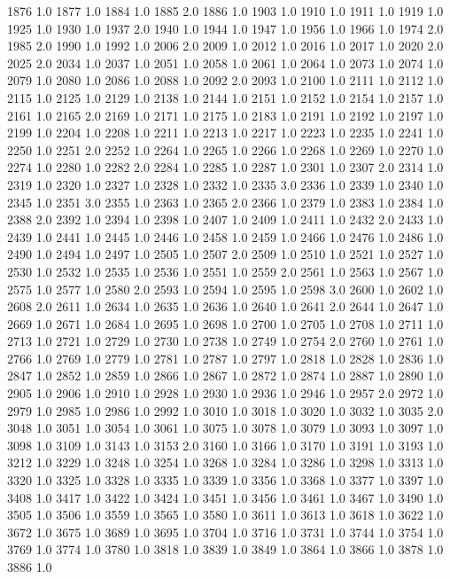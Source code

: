 1876	1.0
1877	1.0
1884	1.0
1885	2.0
1886	1.0
1903	1.0
1910	1.0
1911	1.0
1919	1.0
1925	1.0
1930	1.0
1937	2.0
1940	1.0
1944	1.0
1947	1.0
1956	1.0
1966	1.0
1974	2.0
1985	2.0
1990	1.0
1992	1.0
2006	2.0
2009	1.0
2012	1.0
2016	1.0
2017	1.0
2020	2.0
2025	2.0
2034	1.0
2037	1.0
2051	1.0
2058	1.0
2061	1.0
2064	1.0
2073	1.0
2074	1.0
2079	1.0
2080	1.0
2086	1.0
2088	1.0
2092	2.0
2093	1.0
2100	1.0
2111	1.0
2112	1.0
2115	1.0
2125	1.0
2129	1.0
2138	1.0
2144	1.0
2151	1.0
2152	1.0
2154	1.0
2157	1.0
2161	1.0
2165	2.0
2169	1.0
2171	1.0
2175	1.0
2183	1.0
2191	1.0
2192	1.0
2197	1.0
2199	1.0
2204	1.0
2208	1.0
2211	1.0
2213	1.0
2217	1.0
2223	1.0
2235	1.0
2241	1.0
2250	1.0
2251	2.0
2252	1.0
2264	1.0
2265	1.0
2266	1.0
2268	1.0
2269	1.0
2270	1.0
2274	1.0
2280	1.0
2282	2.0
2284	1.0
2285	1.0
2287	1.0
2301	1.0
2307	2.0
2314	1.0
2319	1.0
2320	1.0
2327	1.0
2328	1.0
2332	1.0
2335	3.0
2336	1.0
2339	1.0
2340	1.0
2345	1.0
2351	3.0
2355	1.0
2363	1.0
2365	2.0
2366	1.0
2379	1.0
2383	1.0
2384	1.0
2388	2.0
2392	1.0
2394	1.0
2398	1.0
2407	1.0
2409	1.0
2411	1.0
2432	2.0
2433	1.0
2439	1.0
2441	1.0
2445	1.0
2446	1.0
2458	1.0
2459	1.0
2466	1.0
2476	1.0
2486	1.0
2490	1.0
2494	1.0
2497	1.0
2505	1.0
2507	2.0
2509	1.0
2510	1.0
2521	1.0
2527	1.0
2530	1.0
2532	1.0
2535	1.0
2536	1.0
2551	1.0
2559	2.0
2561	1.0
2563	1.0
2567	1.0
2575	1.0
2577	1.0
2580	2.0
2593	1.0
2594	1.0
2595	1.0
2598	3.0
2600	1.0
2602	1.0
2608	2.0
2611	1.0
2634	1.0
2635	1.0
2636	1.0
2640	1.0
2641	2.0
2644	1.0
2647	1.0
2669	1.0
2671	1.0
2684	1.0
2695	1.0
2698	1.0
2700	1.0
2705	1.0
2708	1.0
2711	1.0
2713	1.0
2721	1.0
2729	1.0
2730	1.0
2738	1.0
2749	1.0
2754	2.0
2760	1.0
2761	1.0
2766	1.0
2769	1.0
2779	1.0
2781	1.0
2787	1.0
2797	1.0
2818	1.0
2828	1.0
2836	1.0
2847	1.0
2852	1.0
2859	1.0
2866	1.0
2867	1.0
2872	1.0
2874	1.0
2887	1.0
2890	1.0
2905	1.0
2906	1.0
2910	1.0
2928	1.0
2930	1.0
2936	1.0
2946	1.0
2957	2.0
2972	1.0
2979	1.0
2985	1.0
2986	1.0
2992	1.0
3010	1.0
3018	1.0
3020	1.0
3032	1.0
3035	2.0
3048	1.0
3051	1.0
3054	1.0
3061	1.0
3075	1.0
3078	1.0
3079	1.0
3093	1.0
3097	1.0
3098	1.0
3109	1.0
3143	1.0
3153	2.0
3160	1.0
3166	1.0
3170	1.0
3191	1.0
3193	1.0
3212	1.0
3229	1.0
3248	1.0
3254	1.0
3268	1.0
3284	1.0
3286	1.0
3298	1.0
3313	1.0
3320	1.0
3325	1.0
3328	1.0
3335	1.0
3339	1.0
3356	1.0
3368	1.0
3377	1.0
3397	1.0
3408	1.0
3417	1.0
3422	1.0
3424	1.0
3451	1.0
3456	1.0
3461	1.0
3467	1.0
3490	1.0
3505	1.0
3506	1.0
3559	1.0
3565	1.0
3580	1.0
3611	1.0
3613	1.0
3618	1.0
3622	1.0
3672	1.0
3675	1.0
3689	1.0
3695	1.0
3704	1.0
3716	1.0
3731	1.0
3744	1.0
3754	1.0
3769	1.0
3774	1.0
3780	1.0
3818	1.0
3839	1.0
3849	1.0
3864	1.0
3866	1.0
3878	1.0
3886	1.0
